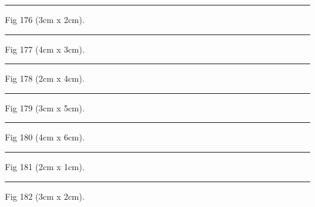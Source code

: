 \documentclass[a4paper,11pt]{article}
\begin{document}
\begin{swarmwrap}%
  \begin{minipage}[t]{3cm}
    \centering
    \rule{\linewidth}{2cm}
    {\footnotesize Fig 176 (3cm x 2cm).}
  \end{minipage}%
\end{swarmwrap}%
\swarmwrapnext
\lipsum[26]%

\begin{swarmwrap}%
  \begin{minipage}[t]{4cm}
    \centering
    \rule{\linewidth}{3cm}
    {\footnotesize Fig 177 (4cm x 3cm).}
  \end{minipage}%
\end{swarmwrap}%
\swarmwrapnext
\lipsum[27]%

\begin{swarmwrap}%
  \begin{minipage}[t]{2cm}
    \centering
    \rule{\linewidth}{4cm}
    {\footnotesize Fig 178 (2cm x 4cm).}
  \end{minipage}%
\end{swarmwrap}%
\swarmwrapnext
\lipsum[28]%

\begin{swarmwrap}%
  \begin{minipage}[t]{3cm}
    \centering
    \rule{\linewidth}{5cm}
    {\footnotesize Fig 179 (3cm x 5cm).}
  \end{minipage}%
\end{swarmwrap}%
\swarmwrapnext
\lipsum[29]%

\begin{swarmwrap}%
  \begin{minipage}[t]{4cm}
    \centering
    \rule{\linewidth}{6cm}
    {\footnotesize Fig 180 (4cm x 6cm).}
  \end{minipage}%
\end{swarmwrap}%
\swarmwrapnext
\lipsum[30]%

\begin{swarmwrap}%
  \begin{minipage}[t]{2cm}
    \centering
    \rule{\linewidth}{1cm}
    {\footnotesize Fig 181 (2cm x 1cm).}
  \end{minipage}%
\end{swarmwrap}%
\swarmwrapnext
\lipsum[31]%

\begin{swarmwrap}%
  \begin{minipage}[t]{3cm}
    \centering
    \rule{\linewidth}{2cm}
    {\footnotesize Fig 182 (3cm x 2cm).}
  \end{minipage}%
\end{swarmwrap}%
\swarmwrapnext
\lipsum[32]%
\end{document}
